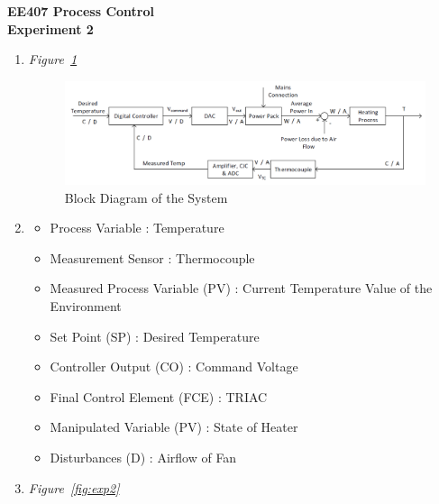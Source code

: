 \documentclass[a4paper,12pt]{article}
\begin{document}
\begin{center}
	\textbf{\large EE407 Process Control \\[0.2cm] Experiment 2} \\
\end{center}


	\begin{enumerate}
		\item 
		
			\textit{Figure~\ref{fig:block}}
			
			\begin{figure}[H]
				\center
				\setlength{\unitlength}{\textwidth} 
				\includegraphics[width=1.0\unitlength]{images/1}
				\caption{\label{fig:block} Block Diagram of the System }
			\end{figure}		
				
				
				
		\item 
		
			\begin{itemize}

				\item Process Variable : Temperature 
				\item Measurement Sensor : Thermocouple
				\item Measured Process Variable (PV) : Current Temperature Value of the Environment
				\item Set Point (SP) : Desired Temperature
				\item Controller Output (CO) : Command Voltage 
				\item Final Control Element (FCE) : TRIAC
				\item Manipulated Variable (PV) : State of Heater
				\item Disturbances (D) : Airflow of Fan
		
		
			\end{itemize}
		
		\item
		
			\textit{Figure~\ref{fig:exp2}}
			

\end{enumerate}
\end{document}
